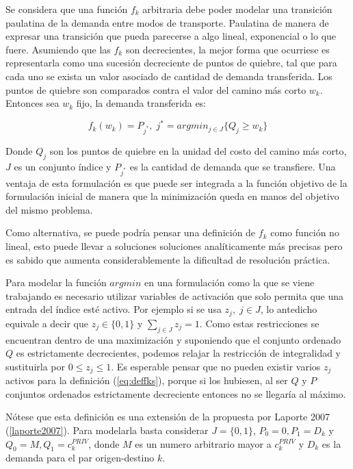 \documentclass{article}
\begin{document}
  Se considera que una función $f_k$ arbitraria debe poder modelar una transición paulatina de la demanda entre modos de transporte. Paulatina de manera de expresar una transición que pueda parecerse a algo lineal, exponencial o lo que fuere. Asumiendo que las $f_k$ son decrecientes, la mejor forma que ocurriese es representarla como una sucesión decreciente de puntos de quiebre, tal que para cada uno se exista un valor asociado de cantidad de demanda transferida. Los puntos de quiebre son comparados contra el valor del camino más corto $w_k$. Entonces sea $w_k$ fijo, la demanda transferida es:

  \begin{equation}
    \label{eq:deffks}
    f_k(w_k) = P_{j^*},\; j^* = argmin_{j \in J} \{Q_j \geq w_k\}
  \end{equation}
  
  Donde $Q_j$ son los puntos de quiebre en la unidad del costo del camino más corto, $J$ es un conjunto índice y $P_{j^*}$ es la cantidad de demanda que se transfiere. Una ventaja de esta formulación es que puede ser integrada a la función objetivo de la formulación inicial de manera que la minimización queda en manos del objetivo del mismo problema.

  Como alternativa, se puede podría pensar una definición de $f_k$ como función no lineal, esto puede llevar a soluciones soluciones analíticamente más precisas pero es sabido que aumenta considerablemente la dificultad de resolución práctica.

  Para modelar la función $argmin$ en una formulación como la que se viene trabajando es necesario utilizar variables de activación que solo permita que una entrada del índice esté activo. Por ejemplo si se usa $z_j,\; j \in J$, lo antedicho equivale a decir que $z_j \in \{0,1\}$ y $\sum_{j \in J} z_j = 1$. Como estas restricciones se encuentran dentro de una maximización y suponiendo que el conjunto ordenado $Q$ es estrictamente decrecientes, podemos relajar la restricción de integralidad y sustituirla por $0 \leq z_j \leq 1$. Es esperable pensar que no pueden existir varios $z_j$ activos para la definición (\ref{eq:deffks}), porque si los hubiesen, al ser $Q$ y $P$ conjuntos ordenados estrictamente decreciente entonces no se llegaría al máximo.

  Nótese que esta definición es una extensión de la propuesta por Laporte 2007 (\ref{laporte2007}). Para modelarla basta considerar $J = \{0, 1\}$, $P_0 = 0, P_1 = D_k$ y $Q_0 = M, Q_1 = c^{PRIV}_k$, donde $M$ es un numero arbitrario mayor a $c^{PRIV}_k$ y $D_k$ es la demanda para el par origen-destino $k$.
\end{document}

